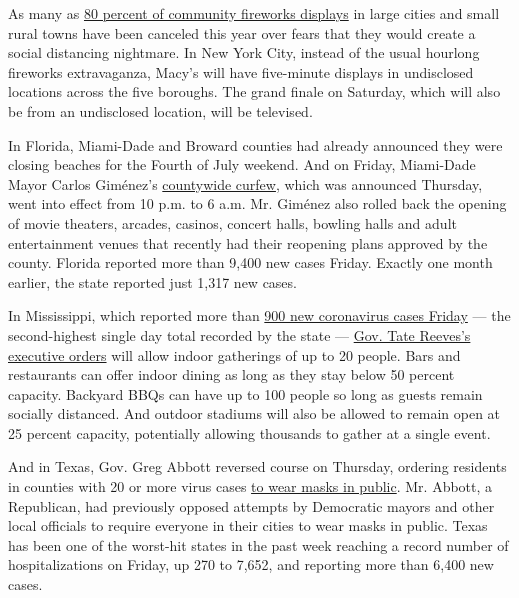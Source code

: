 As many as
\href{https://www.nytimes3xbfgragh.onion/2020/07/01/business/fourth-of-july-fireworks-displays.html}{80
percent of community fireworks displays} in large cities and small rural
towns have been canceled this year over fears that they would create a
social distancing nightmare. In New York City, instead of the usual
hourlong fireworks extravaganza, Macy's will have five-minute displays
in undisclosed locations across the five boroughs. The grand finale on
Saturday, which will also be from an undisclosed location, will be
televised.

In Florida, Miami-Dade and Broward counties had already announced they
were closing beaches for the Fourth of July weekend. And on Friday,
Miami-Dade Mayor Carlos Giménez's
\href{https://www.miamidade.gov/releases/2020-07-02-mayor-covid-measures.asp}{countywide
curfew}, which was announced Thursday, went into effect from 10 p.m. to
6 a.m. Mr. Giménez also rolled back the opening of movie theaters,
arcades, casinos, concert halls, bowling halls and adult entertainment
venues that recently had their reopening plans approved by the county.
Florida reported more than 9,400 new cases Friday. Exactly one month
earlier, the state reported just 1,317 new cases.

In Mississippi, which reported more than
\href{https://www.nytimes3xbfgragh.onion/interactive/2020/us/mississippi-coronavirus-cases.html}{900
new coronavirus cases Friday} --- the second-highest single day total
recorded by the state ---
\href{https://governorreeves.ms.gov/wp-content/uploads/Executive-Order-1496-Extend-Safe-Return-Order.pdf}{Gov.
Tate Reeves's executive orders} will allow indoor gatherings of up to 20
people. Bars and restaurants can offer indoor dining as long as they
stay below 50 percent capacity. Backyard BBQs can have up to 100 people
so long as guests remain socially distanced. And outdoor stadiums will
also be allowed to remain open at 25 percent capacity, potentially
allowing thousands to gather at a single event.

And in Texas, Gov. Greg Abbott reversed course on Thursday, ordering
residents in counties with 20 or more virus cases
\href{https://www.nytimes3xbfgragh.onion/2020/07/02/us/coronavirus-texas-masks.html}{to
wear masks in public}. Mr. Abbott, a Republican, had previously opposed
attempts by Democratic mayors and other local officials to require
everyone in their cities to wear masks in public. Texas has been one of
the worst-hit states in the past week reaching a record number of
hospitalizations on Friday, up 270 to 7,652, and reporting more than
6,400 new cases.

